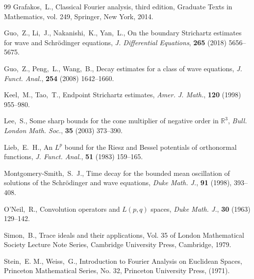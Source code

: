 \documentclass[a4paper]{amsart}
\numberwithin{equation}{section}%
\theoremstyle{plain}%
\theoremstyle{definition}
\theoremstyle{remark}%
\begin{document}
\begin{thebibliography}{99}
 Grafakos,~L., 
Classical Fourier analysis, 
third edition, Graduate Texts in Mathematics, vol. 249, Springer, New York, 2014.

Guo,~Z., Li,~J., Nakanishi,~K., Yan,~L., 
On the boundary Strichartz estimates for wave and Schr\"{o}dinger equations, 
\textit{J. Differential Equations}, 
\textbf{265} (2018) 5656--5675.

 Guo,~Z., Peng,~L., Wang,~B., 
Decay estimates for a class of wave equations, 
\textit{J. Funct. Anal.}, 
\textbf{254} (2008) 1642--1660.

Keel,~M., Tao,~T., 
Endpoint Strichartz estimates, 
\textit{Amer. J. Math.},
\textbf{120} (1998) 955--980.

Lee,~S.,
Some sharp bounds for the cone multiplier of negative order in ${\mathbb R}^3$, 
\textit{Bull. London Math. Soc.}, 
\textbf{35} (2003) 373--390.

Lieb,~E.~H., 
An $L^p$ bound for the Riesz and Bessel potentials of orthonormal functions, 
\textit{J. Funct. Anal.}, 
\textbf{51} (1983) 159--165.

 Montgomery-Smith,~S.~J., 
Time decay for the bounded mean oscillation of solutions of the Schr\"odinger and wave equations, 
\textit{Duke Math. J.}, \textbf{91} (1998), 393--408.


 O'Neil,~R., 
Convolution operators and $L(p, q)$ spaces, 
\textit{Duke Math. J.}, 
\textbf{30} (1963) 129--142.

 Simon,~B., 
Trace ideals and their applications, 
Vol. 35 of London Mathematical Society Lecture Note Series, Cambridge University Press, Cambridge, 1979.

 Stein,~E. M., Weiss,~G., 
Introduction to Fourier Analysis on Euclidean Spaces, 
Princeton Mathematical Series, No. 32, Princeton University Press, (1971).
\end{thebibliography}
\end{document}
